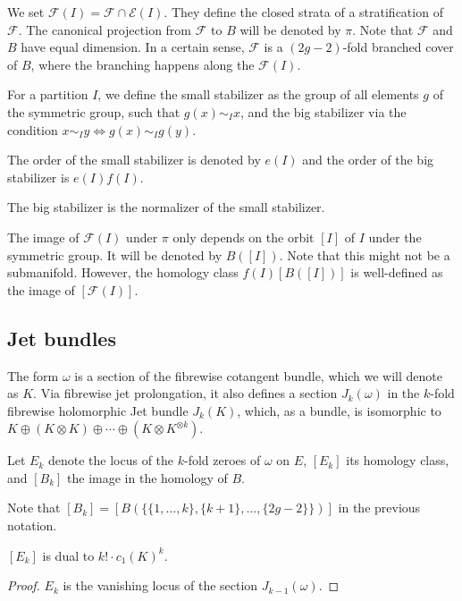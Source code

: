 We set $\mathcal{F}(I) = \mathcal{F} \cap \mathcal{E}(I)$.
They define the closed strata of a stratification of $\mathcal{F}$.
The canonical projection from $\mathcal{F}$ to $B$ will be denoted
by $\pi$. Note that $\mathcal{F}$ and $B$ have equal dimension.
In a certain sense, $\mathcal{F}$ is a $(2g-2)$-fold branched cover
of $B$, where the branching happens along the $\mathcal{F}(I)$.

\begin{defn}
For a partition $I$, we define the small stabilizer as the group of all
elements $g$ of the symmetric group, such that $g(x) \sim_I x$,
and the big stabilizer via the condition
$x \sim_I y \Leftrightarrow g(x) \sim_I g(y)$.

The order of the small stabilizer is denoted by $e(I)$ and the
order of the big stabilizer is $e(I)f(I)$.
\end{defn}

The big stabilizer is the normalizer of the small stabilizer.

The image of $\mathcal{F}(I)$ under $\pi$ only depends on the
orbit $[I]$ of $I$ under the symmetric group. It will be
denoted by $B([I])$. Note that this might not be a submanifold.
However, the homology class $f(I)[B([I])]$ is well-defined as
the image of $[\mathcal{F}(I)]$.

\subsection{Jet bundles}
The form $\omega$ is a section of the fibrewise cotangent bundle,
which we will denote as $K$. Via fibrewise jet prolongation,
it also defines a section $J_k(\omega)$ in the $k$-fold
fibrewise holomorphic Jet bundle $J_k(K)$, which, as a bundle, is isomorphic to
$K \oplus ( K \otimes K ) \oplus \cdots \oplus ( K \otimes K^{\otimes k} )$.

Let $E_k$ denote the locus of the $k$-fold zeroes of $\omega$ on $E$,
$[E_k]$ its homology class, and $[B_k]$ the image in the homology of $B$.

Note that $[B_k] = [B(\{\{1,\ldots,k\},\{k+1\},\ldots,\{2g-2\}\})]$
in the previous notation.

\begin{prop}
$[E_k]$ is dual to $k! \cdot c_1(K)^k$.
\end{prop}
\begin{proof}
$E_k$ is the vanishing locus of the section $J_{k-1}(\omega)$.
\end{proof}

